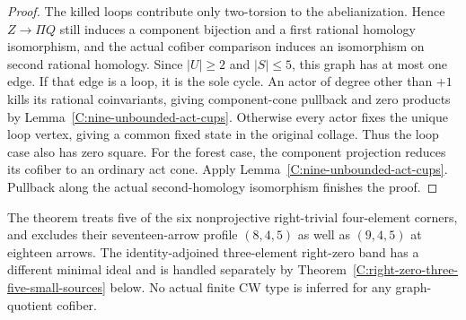 \begin{proof}
The killed loops contribute only two-torsion to the
abelianization. Hence $Z\to\Pi Q$ still induces a
component bijection and a first rational homology
isomorphism, and the actual cofiber comparison induces
an isomorphism on second rational homology.
Since $|U|\geq2$ and $|S|\leq5$, this graph has at most
one edge. If that edge is a loop, it is the sole cycle.
An actor of degree other than $+1$ kills its rational
coinvariants, giving component-cone pullback and zero
products by Lemma~\ref{C:nine-unbounded-act-cups}.
Otherwise every actor fixes the unique loop vertex, giving
a common fixed state in the original collage. Thus the
loop case also has zero square.
For the forest case, the component projection reduces its
cofiber to an ordinary act cone. Apply
Lemma~\ref{C:nine-unbounded-act-cups}. Pullback along the
actual second-homology isomorphism finishes the proof.
\end{proof}

\begin{remark}
\label{C:four-corner-five-state-partial-scope}
The theorem treats five of the six nonprojective right-trivial
four-element corners, and excludes their seventeen-arrow
profile $(8,4,5)$ as well as $(9,4,5)$ at eighteen arrows.
The identity-adjoined three-element right-zero band has a
different minimal ideal and is handled separately by
Theorem~\ref{C:right-zero-three-five-small-sources} below.
No actual finite CW type is inferred for any graph-quotient cofiber.
\end{remark}
